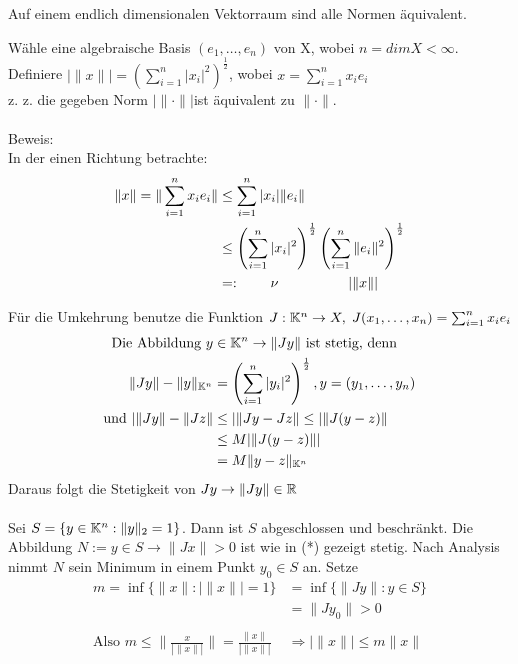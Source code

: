 \begin{satz}
	Auf einem endlich dimensionalen Vektorraum sind alle Normen äquivalent.
\end{satz}
\begin{beweis}
	Wähle eine algebraische Basis $(e_{1}, \dotsc, e_{n})$ von X, wobei $ n = dim X < \infty$. \\
	Definiere $|\|x\|| = \left(\sum_{i = 1}^{n} |x_{i}|^2\right)^{\frac{1}{2}}$, wobei $x = \sum_{i = 1}^{n} x_{i} e_{i}$ \\
	
	z. z. die gegeben Norm $|\| \cdot \||$ist äquivalent zu $\| \cdot \|$. \\ \\
	Beweis: \\
	In der einen Richtung betrachte: 
	\begin{align*}
		\| x \| = \| \sum_{i = 1}^{n} x_{i} e_{i} \| & \leq \sum_{i = 1}^{n} |x_{i}| \|  e_{i} \| \\ 
													& \leq \left( \sum_{i = 1}^{n} |x_{i}|^{2} \right)^\frac{1}{2}  \left( \sum_{i = 1}^{n} \| e_{i} \|^{2} \right)^\frac{1}{2} \\
													& =: \hspace{0.75cm} \nu \hspace{1.75cm} |\| x \||		
	\end{align*}
	
	Für die Umkehrung benutze die Funktion $J: \mathbb{K}^{n} \rightarrow X, \hspace{0.1cm} J(x_{1}, \dotsc, x_{n}) = \sum_{i = 1}^{n} x_{i} e_{i} $ \\
	\begin{align*}
 	 \text{Die Abbildung } y & \in \mathbb{K}^{n}  \rightarrow \| Jy \| \text{ ist stetig, denn} \\
 	 	 \| Jy \| - \| y \|_{\mathbb{K}^{n}} & = \left( \sum_{i = 1}^{n} |y_{i}|^{2} \right)^{\frac{1}{2}}, y = (y_{1}, \dotsc, y_{n}) \\
 	 	 \text{und } | \| Jy \| - \| Jz \| & \leq | \| Jy - Jz \| \leq | \| J(y - z) \| \\
 	 	 & \leq M |\|J (y - z) \|| \\
 	 	 & = M \| y - z \|_{\mathbb{K}^{n}} \\
 	 \end{align*}
 Daraus folgt die Stetigkeit von $ Jy \rightarrow \| Jy \| \in \mathbb{R} $ \\ \\
	Sei $S = \{y \in \mathbb{K}^{n}: \| y \|_2 = 1 \}$. Dann ist $S$ abgeschlossen und beschränkt.
	Die Abbildung $N := y \in S \rightarrow \| Jx \| > 0$ ist wie in (*) gezeigt stetig. Nach Analysis nimmt $N$ sein Minimum in einem Punkt $y_{0} \in S$ an. Setze
		\begin{align*}
			m = \inf\{\| x \| : |\| x \|| = 1\} & = \inf \{ \| Jy \|: y \in S \} \\
												& = \| J y_{0} \| > 0 \\ \\
			\text{Also } m \leq \| \frac{x}{ |\| x \|| } \| =  \frac{ \| x \| }{ |\| x \|| }  &\Rightarrow |\| x \|| \leq m \| x \|
		\end{align*}
\end{beweis}

